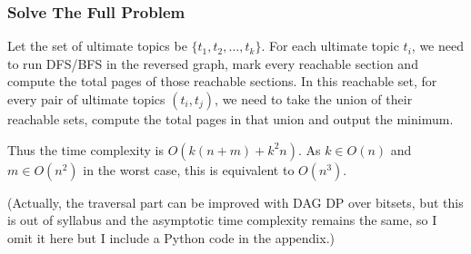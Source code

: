 \documentclass[12pt]{article}
\begin{document}
\subsubsection{Solve The Full Problem}
Let the set of ultimate topics be $\{t_1,t_2,\dots,t_k\}$. For each ultimate topic $t_i$, we need to run DFS/BFS in the reversed graph, mark every reachable section and compute the total pages of those reachable sections. In this reachable set, for every pair of ultimate topics $(t_i,t_j)$, we need to take the union of their reachable sets, compute the total pages in that union and output the minimum.

Thus the time complexity is $O\left(k(n+m)+k^2n\right)$. As $k\in O(n)$ and $m\in O\left(n^2\right)$ in the worst case, this is equivalent to $O\left(n^3\right)$.

(Actually, the traversal part can be improved with DAG DP over bitsets, but this is out of syllabus and the asymptotic time complexity remains the same, so I omit it here but I include a Python code in the appendix.)
\newpage
\end{document}
